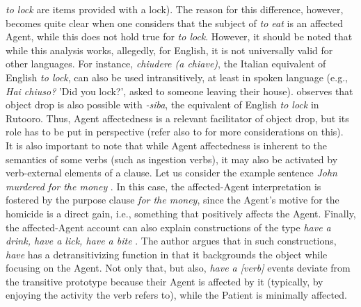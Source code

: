 \textit{to lock} are items provided with a lock). The reason for this difference, however, becomes quite clear when one considers that the subject of \textit{to eat} is an affected Agent, while this does not hold true for \textit{to lock}. However, it should be noted that while this analysis works, allegedly, for English, it is not universally valid for other languages. For instance, \textit{chiudere (a chiave)}, the Italian equivalent of English \textit{to lock}, can also be used intransitively, at least in spoken language (e.g., \textit{Hai chiuso?} 'Did you lock?', asked to someone leaving their house). \textcite{Isingoma2020} observes that object drop is also possible with \textit{-siba}, the equivalent of English \textit{to lock} in Rutooro. Thus, Agent affectedness is a relevant facilitator of object drop, but its role has to be put in perspective (refer also to  for more considerations on this).\\
It is also important to note that while Agent affectedness is inherent to the semantics of some verbs (such as ingestion verbs), it may also be activated by verb-external elements of a clause. Let us consider the example sentence \textit{John murdered for the money} \parencite[136]{Naess2007}. In this case, the affected-Agent interpretation is fostered by the purpose clause \textit{for the money}, since the Agent's motive for the homicide is a direct gain, i.e., something that positively affects the Agent. Finally, the affected-Agent account can also explain constructions of the type \textit{have a drink, have a lick, have a bite} \parencite[758, 771]{Wierzbicka1982}. The author argues that in such constructions, \textit{have} has a detransitivizing function in that it backgrounds the object while focusing on the Agent. Not only that, but also, \textit{have a [verb]} events deviate from the transitive prototype because their Agent is affected by it (typically, by enjoying the activity the verb refers to), while the Patient is minimally affected.\\
